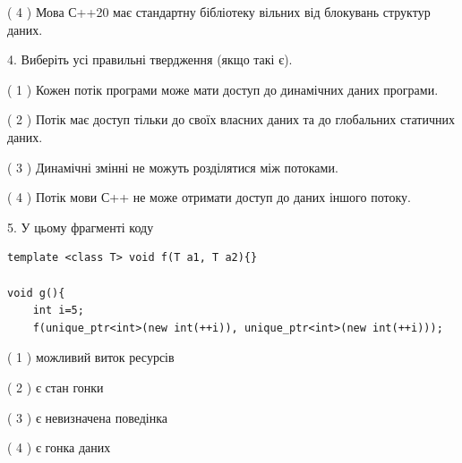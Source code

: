 \documentclass[12pt, ukrainian]{article}
\begin{document}
\begin {large}
{( 4 ) Мова С++20 має стандартну бібліотеку вільних від блокувань структур даних.%


4. Виберіть усі правильні твердження (якщо такі є).\par
\vspace{2mm}

( 1 ) Кожен потік програми може мати доступ до динамічних даних програми.%

( 2 ) Потік має доступ тільки до своїх власних даних та до глобальних статичних даних.%

( 3 ) Динамічні змінні не можуть розділятися між потоками.%

( 4 ) Потік мови С++ не може отримати доступ до даних іншого потоку.%


5. У цьому фрагменті коду
\begin{verbatim}
template <class T> void f(T a1, T a2){}

void g(){
    int i=5;
    f(unique_ptr<int>(new int(++i)), unique_ptr<int>(new int(++i)));
\end{verbatim}

( 1 ) можливий виток ресурсів%

( 2 ) є стан гонки%

( 3 ) є невизначена поведінка%

( 4 ) є гонка даних%
}
\end {large}
\end{document}
